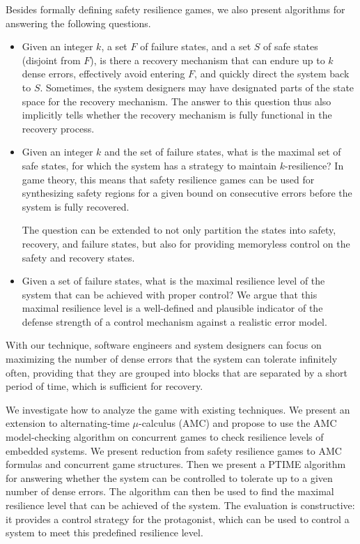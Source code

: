 Besides formally defining safety resilience games, we also present algorithms 
for answering the following questions.  
\label{reply2.alg.sfrch.res}
\begin{itemize} 
\item Given an integer $k$, a set $F$ of failure states, and 
  a set $S$ of safe states (disjoint from $F$), is there a recovery mechanism that 
  can endure up to $k$ dense errors, 
  effectively avoid entering $F$, and quickly direct the system back to $S$.  
  Sometimes, the system designers may have designated parts of the state space 
  for the recovery mechanism.  
  The answer to this question thus also implicitly tells 
  whether the recovery 
  mechanism is fully functional in the recovery process. 
\item Given an integer $k$ and the set of failure states, 
  what is the maximal set of safe states, 
  for which the system has a strategy to maintain $k$-resilience?
  In game theory, this means that 
  safety resilience games can be used for synthesizing safety regions 
  for a given bound on consecutive errors before the system is fully recovered.  
  
The question can be extended to not only partition the states into safety, recovery, and failure states, but also for providing memoryless control on the safety and recovery states.
  
\item Given a set of failure states, what is the maximal resilience level of the system that can be achieved with proper control?  
  We argue that this maximal resilience level is a well-defined and plausible indicator of 
  the defense strength of a control mechanism against a realistic error model. 
\end{itemize} 
With our technique, 
software engineers and system designers 
can focus on maximizing the number of dense errors that 
the system can tolerate infinitely often, providing that they are grouped into blocks that are separated by a short period of time, which is sufficient for recovery.

We investigate how to analyze the game with existing techniques. 
We present an extension to alternating-time $\mu$-calculus (AMC) 
and propose to use the AMC model-checking algorithm on concurrent games to check 
resilience levels of embedded systems. 
We present reduction from safety resilience games to 
AMC formulas and concurrent game structures.  
Then we present a PTIME algorithm for answering whether the system can be 
controlled to tolerate up to a given number of dense errors.  
The algorithm can then be used to find the maximal resilience level 
that can be achieved of the system. 
The evaluation is constructive:  
it provides a control strategy  
for the protagonist, which can be used to control a system 
to meet this predefined resilience level.

